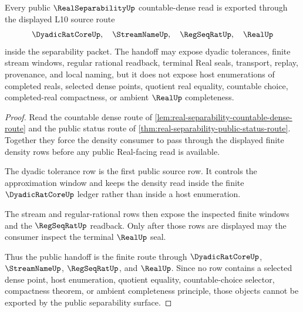 \begin{theorem}
\label{thm:real-separability-public-closure-handoff}
Every public $\RealSeparabilityUp$ countable-dense read is exported through the displayed L10 source route
$$
\DyadicRatCoreUp,\quad \StreamNameUp,\quad \RegSeqRatUp,\quad \RealUp
$$
inside the separability packet. The handoff may expose dyadic tolerances, finite stream windows, regular rational readback, terminal Real seals, transport, replay, provenance, and local naming, but it does not expose host enumerations of completed reals, selected dense points, quotient real equality, countable choice, completed-real compactness, or ambient $\RealUp$ completeness.
\end{theorem}
\begin{proof}
Read the countable dense route of \autoref{lem:real-separability-countable-dense-route} and the public status route of \autoref{thm:real-separability-public-status-route}. Together they force the density consumer to pass through the displayed finite density rows before any public Real-facing read is available.

The dyadic tolerance row is the first public source row. It controls the approximation window and keeps the density read inside the finite $\DyadicRatCoreUp$ ledger rather than inside a host enumeration.

The stream and regular-rational rows then expose the inspected finite windows and the $\RegSeqRatUp$ readback. Only after those rows are displayed may the consumer inspect the terminal $\RealUp$ seal.

Thus the public handoff is the finite route through $\DyadicRatCoreUp$, $\StreamNameUp$, $\RegSeqRatUp$, and $\RealUp$. Since no row contains a selected dense point, host enumeration, quotient equality, countable-choice selector, compactness theorem, or ambient completeness principle, those objects cannot be exported by the public separability surface.
\end{proof}

